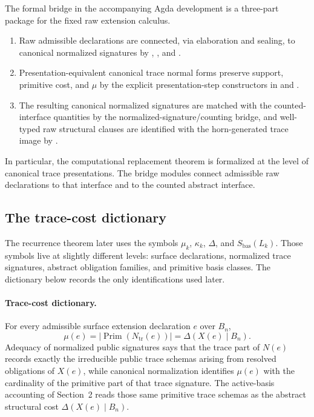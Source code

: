 \documentclass{lmcs}
\begin{document}
\begin{rem}
The formal bridge in the accompanying Agda development is a three-part package for the
fixed raw extension calculus.

\begin{enumerate}
\item Raw admissible declarations are connected, via elaboration and sealing, to canonical
normalized signatures by
,
, and
.

\item Presentation-equivalent canonical trace normal forms preserve support, primitive cost,
and \(\mu\) by the explicit presentation-step constructors in
 and
.

\item The resulting canonical normalized signatures are matched with the counted-interface
quantities by the normalized-signature/counting bridge, and well-typed raw structural clauses
are identified with the horn-generated trace image by
.
\end{enumerate}

In particular, the computational replacement theorem is formalized at the level of canonical
trace presentations.  The bridge modules connect admissible raw declarations to that
interface and to the counted abstract interface.
\end{rem}

\subsection{The trace-cost dictionary}

The recurrence theorem later uses the symbols \(\mu_k\), \(\kappa_k\), \(\Delta\), and
\(S_{\mathrm{bas}}(L_k)\).  Those symbols live at slightly different levels: surface
declarations, normalized trace signatures, abstract obligation families, and primitive basis
classes.  The dictionary below records the only identifications used later.

\paragraph{Trace-cost dictionary.}
For every admissible surface extension declaration \(e\) over \(B_n\),
\[
  \mu(e)
  = \left|\operatorname{Prim}(N_{\mathrm{tr}}(e))\right|
  = \Delta(X(e)\mid B_n).
\]
Adequacy of normalized public signatures says that the trace part of \(N(e)\) records exactly
the irreducible public trace schemas arising from resolved obligations of \(X(e)\), while
canonical normalization identifies \(\mu(e)\) with the cardinality of the primitive part of that
trace signature.  The active-basis accounting of Section~2 reads those same primitive trace
schemas as the abstract structural cost \(\Delta(X(e)\mid B_n)\).
\end{document}
